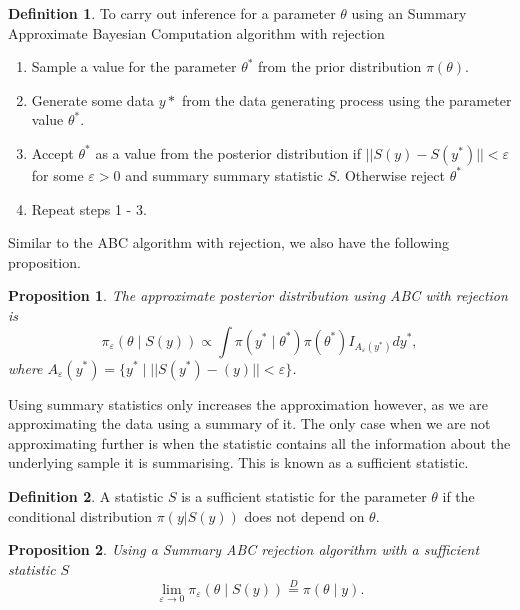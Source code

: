 \documentclass[
]{book}
\providecommand{\tightlist}{%
  \setlength{\itemsep}{0pt}\setlength{\parskip}{0pt}}
\newtheorem{proposition}{Proposition}[chapter]
\theoremstyle{definition}
\newtheorem{definition}{Definition}[chapter]
\theoremstyle{definition}
\theoremstyle{definition}
\theoremstyle{definition}
\theoremstyle{remark}
\begin{document}
\begin{definition}

To carry out inference for a parameter \(\theta\) using an Summary Approximate Bayesian Computation algorithm with rejection

\begin{enumerate}
\def\labelenumi{\arabic{enumi}.}
\tightlist
\item
  Sample a value for the parameter \(\theta^*\) from the prior distribution \(\pi(\theta)\).
\item
  Generate some data \(y*\) from the data generating process using the parameter value \(\theta^*\).
\item
  Accept \(\theta^*\) as a value from the posterior distribution if \(||S(y) - S(y^*)|| < \varepsilon\) for some \(\varepsilon > 0\) and summary summary statistic \(S\). Otherwise reject \(\theta^*\)
\item
  Repeat steps 1 - 3.
\end{enumerate}

\end{definition}

Similar to the ABC algorithm with rejection, we also have the following proposition.

\begin{proposition}
The approximate posterior distribution using ABC with rejection is
\[
\pi_\varepsilon(\theta \mid S(y)) \propto \int \pi(y^* \mid \theta^*)\pi(\theta^*)I_{A_\varepsilon(y^*)} dy^*,
\]
where \({A_\varepsilon(y^*)} = \{y^* \mid ||S(y^*) - (y)||< \varepsilon\}\).
\end{proposition}

Using summary statistics only increases the approximation however, as we are approximating the data using a summary of it. The only case when we are not approximating further is when the statistic contains all the information about the underlying sample it is summarising. This is known as a sufficient statistic.

\begin{definition}
A statistic \(S\) is a sufficient statistic for the parameter \(\theta\) if the conditional distribution \(\pi(y | S(y))\) does not depend on \(\theta\).
\end{definition}

\begin{proposition}
Using a Summary ABC rejection algorithm with a sufficient statistic \(S\)
\[
\lim_{\varepsilon \rightarrow 0} \pi_\varepsilon(\theta \mid S(y)) \overset{D}= \pi(\theta \mid y).
\]
\end{proposition}
\end{document}
